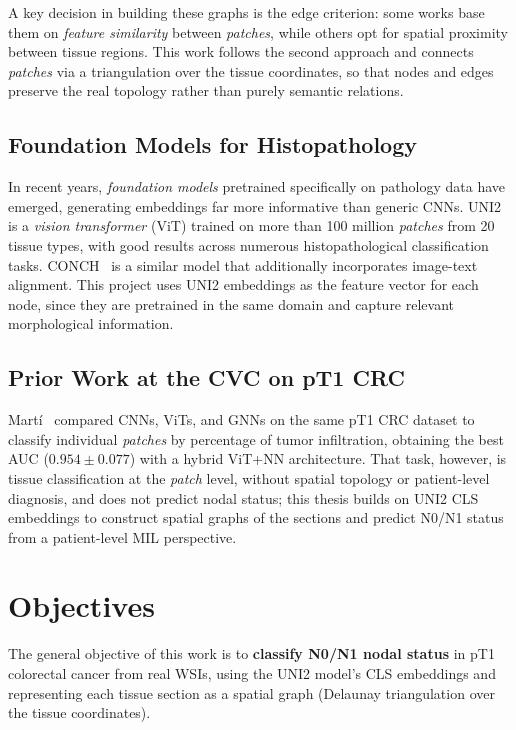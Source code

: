 \documentclass[10pt,a4paper,twocolumn,twoside]{article}
\begin{document}
A key decision in building these graphs is the edge criterion: some
works base them on \textit{feature similarity} between \textit{patches},
while others opt for spatial proximity between tissue regions.
This work follows the second approach and connects \textit{patches} via a
triangulation over the tissue coordinates, so that nodes and edges
preserve the real topology rather than purely semantic relations.

\subsection{Foundation Models for Histopathology}

In recent years, \textit{foundation models} pretrained specifically
on pathology data have emerged, generating embeddings far more informative than
generic CNNs. UNI2~\cite{chen2024uni2} is a \textit{vision transformer} (ViT) trained on
more than 100 million \textit{patches} from 20 tissue types, with good results across
numerous histopathological classification tasks. CONCH~\cite{lu2024conch} is a
similar model that additionally incorporates image-text alignment. This project uses
UNI2 embeddings as the feature vector for each node, since they are
pretrained in the same domain and capture relevant morphological information.

\subsection{Prior Work at the CVC on pT1 CRC}

Martí~\cite{ddd.uab.cat:317556} compared CNNs, ViTs, and GNNs on the same
pT1 CRC dataset to classify individual \textit{patches} by percentage of tumor
infiltration, obtaining the best AUC ($0.954 \pm 0.077$) with a hybrid ViT+NN
architecture. That task, however, is tissue classification at the \textit{patch}
level, without spatial topology or patient-level diagnosis, and does not predict nodal status; this thesis
builds on UNI2 CLS embeddings to construct spatial graphs of the sections
and predict N0/N1 status from a patient-level MIL perspective.

\section{Objectives}

The general objective of this work is to \textbf{classify N0/N1 nodal status} in
pT1 colorectal cancer from real WSIs, using the UNI2 model's CLS embeddings
and representing each tissue section as a spatial graph (Delaunay triangulation
over the tissue coordinates).
\end{document}
